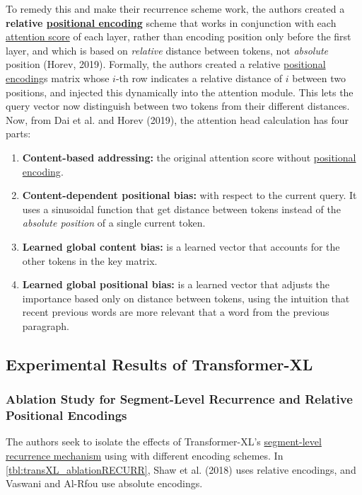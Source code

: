 To remedy this and make their recurrence scheme work, the authors created a \textbf{relative \hyperref[sec:PosEncodings]{positional encoding}} scheme that works in conjunction with each \hyperref[sec:AttentionMechanism]{attention score} of each layer, rather than encoding position only before the first layer, and which is based on \emph{relative} distance between tokens, not \emph{absolute} position (Horev, 2019). Formally, the authors created a relative \hyperref[sec:PosEncodings]{positional encoding}s matrix whose $i$-th row indicates a relative distance of $i$ between two positions, and injected this dynamically into the attention module. This lets the query vector now distinguish between two tokens from their different distances. Now, from Dai et al. and Horev (2019), the attention head calculation has four parts: 
\begin{enumerate}
    \item \textbf{Content-based addressing: }the original attention score without \hyperref[sec:PosEncodings]{positional encoding}.
    
    \item \textbf{Content-dependent positional bias: }with respect to the current query. It uses a sinusoidal function that get distance between tokens instead of the \emph{absolute position} of a single current token. 
    
    \item \textbf{Learned global content bias: } is a learned vector that accounts for the other tokens in the key matrix.
    
    \item \textbf{Learned global positional bias: }is a learned vector that adjusts the importance based only on distance between tokens, using the intuition that recent previous words are more relevant that a word from the previous paragraph. 
\end{enumerate}


\subsection{Experimental Results of Transformer-XL} \label{sec:ExpResultsTransXL}

\subsubsection{Ablation Study for Segment-Level Recurrence and Relative Positional Encodings}

The authors seek to isolate the effects of Transformer-XL's \hyperref[sec:SegmentLevelRec]{segment-level recurrence mechanism} using with different encoding schemes. In \cref{tbl:transXL_ablationRECURR}, Shaw et al. (2018) uses relative encodings, and Vaswani and Al-Rfou use absolute encodings. 






